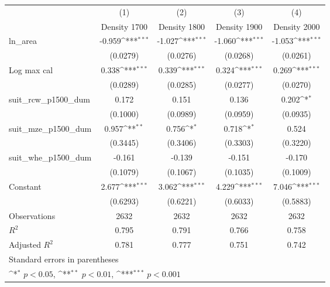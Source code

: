 {
\def\sym#1{\ifmmode^{#1}\else\(^{#1}\)\fi}
\begin{tabular}{l*{4}{c}}
\toprule
                    &\multicolumn{1}{c}{(1)}&\multicolumn{1}{c}{(2)}&\multicolumn{1}{c}{(3)}&\multicolumn{1}{c}{(4)}\\
                    &\multicolumn{1}{c}{Density 1700}&\multicolumn{1}{c}{Density 1800}&\multicolumn{1}{c}{Density 1900}&\multicolumn{1}{c}{Density 2000}\\
\midrule
ln\_area             &      -0.959\sym{***}&      -1.027\sym{***}&      -1.060\sym{***}&      -1.053\sym{***}\\
                    &    (0.0279)         &    (0.0276)         &    (0.0268)         &    (0.0261)         \\
\addlinespace
Log max cal         &       0.338\sym{***}&       0.339\sym{***}&       0.324\sym{***}&       0.269\sym{***}\\
                    &    (0.0289)         &    (0.0285)         &    (0.0277)         &    (0.0270)         \\
\addlinespace
suit\_rcw\_p1500\_dum  &       0.172         &       0.151         &       0.136         &       0.202\sym{*}  \\
                    &    (0.1000)         &    (0.0989)         &    (0.0959)         &    (0.0935)         \\
\addlinespace
suit\_mze\_p1500\_dum  &       0.957\sym{**} &       0.756\sym{*}  &       0.718\sym{*}  &       0.524         \\
                    &    (0.3445)         &    (0.3406)         &    (0.3303)         &    (0.3220)         \\
\addlinespace
suit\_whe\_p1500\_dum  &      -0.161         &      -0.139         &      -0.151         &      -0.170         \\
                    &    (0.1079)         &    (0.1067)         &    (0.1035)         &    (0.1009)         \\
\addlinespace
Constant            &       2.677\sym{***}&       3.062\sym{***}&       4.229\sym{***}&       7.046\sym{***}\\
                    &    (0.6293)         &    (0.6221)         &    (0.6033)         &    (0.5883)         \\
\midrule
Observations        &        2632         &        2632         &        2632         &        2632         \\
\(R^{2}\)           &       0.795         &       0.791         &       0.766         &       0.758         \\
Adjusted \(R^{2}\)  &       0.781         &       0.777         &       0.751         &       0.742         \\
\bottomrule
\multicolumn{5}{l}{\footnotesize Standard errors in parentheses}\\
\multicolumn{5}{l}{\footnotesize \sym{*} \(p<0.05\), \sym{**} \(p<0.01\), \sym{***} \(p<0.001\)}\\
\end{tabular}
}
